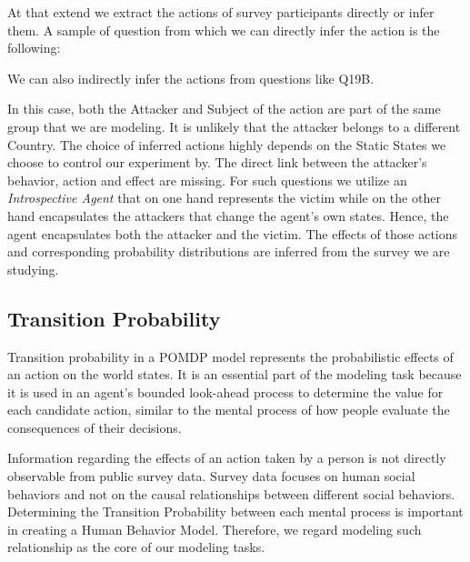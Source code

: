 {At that extend we extract the actions of survey participants directly or infer them. A sample of question from which we can directly infer the action is the following:

We can also indirectly infer the actions from questions like Q19B.


In this case, both the Attacker and Subject of the action are part of the same group that we are modeling. It is unlikely that the attacker belongs to a different Country. The choice of inferred actions highly depends on the Static States we choose to control our experiment by. The direct link between the attacker's behavior, action and effect are missing. For such questions we utilize an \textit{Introspective Agent} that on one hand represents the victim while on the other hand encapsulates the attackers that change the agent's own states. Hence, the agent encapsulates both the attacker and the victim. The effects of those actions and corresponding probability distributions are inferred from the survey we are studying. 

\subsection{Transition Probability} 


Transition probability in a POMDP model represents the probabilistic effects of an action on the world states. It is an essential part of the modeling task because it is used in an agent's bounded look-ahead process to determine the value for each candidate action, similar to the mental process of how people evaluate the consequences of their decisions. 


Information regarding the effects of an action taken by a person is not directly observable from public survey data. Survey data focuses on human social behaviors and not on the causal relationships between different social behaviors. Determining the Transition Probability between each mental process is important in creating a Human Behavior Model. Therefore, we regard modeling such relationship as the core of our modeling tasks.

}
